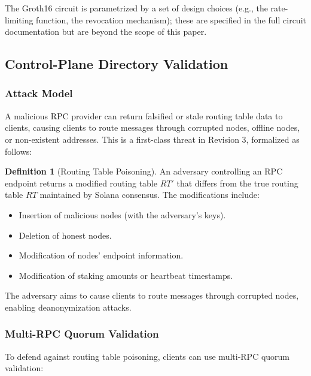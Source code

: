\documentclass[11pt]{article}
\theoremstyle{definition}
\newtheorem{definition}{Definition}
\theoremstyle{remark}
\begin{document}
The Groth16 circuit is parametrized by a set of design choices (e.g., the rate-limiting function, the revocation mechanism); these are specified in the full circuit documentation but are beyond the scope of this paper.

\subsection{Control-Plane Directory Validation}
\label{subsec:directory}

\subsubsection{Attack Model}

A malicious RPC provider can return falsified or stale routing table data to clients, causing clients to route messages through corrupted nodes, offline nodes, or non-existent addresses. This is a first-class threat in Revision 3, formalized as follows:

\begin{definition}[Routing Table Poisoning]
An adversary controlling an RPC endpoint returns a modified routing table $RT'$ that differs from the true routing table $RT$ maintained by Solana consensus. The modifications include:
\begin{itemize}
    \item Insertion of malicious nodes (with the adversary's keys).
    \item Deletion of honest nodes.
    \item Modification of nodes' endpoint information.
    \item Modification of staking amounts or heartbeat timestamps.
\end{itemize}
The adversary aims to cause clients to route messages through corrupted nodes, enabling deanonymization attacks.
\end{definition}

\subsubsection{Multi-RPC Quorum Validation}

To defend against routing table poisoning, clients can use multi-RPC quorum validation:
\end{document}
